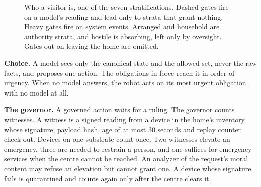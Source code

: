 \documentclass[10pt,twocolumn]{article}
\begin{document}
\begin{figure}[t]
\centering
{}
\caption{Who a visitor is, one of the seven stratifications. Dashed gates fire on a model's reading
and lead only to strata that grant nothing. Heavy gates fire on system events. Arranged and
household are authority strata, and hostile is absorbing, left only by oversight. Gates out on
leaving the home are omitted.}
\label{fig:strata}
\end{figure}

\textbf{Choice.} A model sees only the canonical state and the allowed set, never the raw facts,
and proposes one action. The obligations in force reach it in order of urgency. When no model
answers, the robot acts on its most urgent obligation with no model at all.

\textbf{The governor.} A governed action waits for a ruling. The governor counts witnesses. A
witness is a signed reading from a device in the home's inventory whose signature, payload hash,
age of at most 30 seconds and replay counter check out. Devices on one substrate count once. Two
witnesses elevate an emergency, three are needed to restrain a person, and one suffices for
emergency services when the centre cannot be reached. An analyzer of the request's moral content may refuse an elevation
but cannot grant one. A device whose signature fails is quarantined and counts again only after
the centre clears it.
\end{document}
